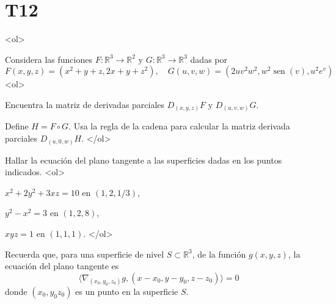 \documentclass{article}
\theoremstyle{definition}
\newcommand{\sen}{\operatorname{sen}}
\begin{document}
  \section*{T12 }
  <ol>
  

    
  \item Considera las funciones $F:\mathbb{R}^3\to \mathbb{R}^2$ y $G:\mathbb{R}^3\to \mathbb{R}^3$ dadas
    por
    $$
    F(x,y,z)=(x^2+y+z, 2x+y+z^2), \quad G(u,v,w)=(2uv^2w^2,w^2\sen(v),u^2e^v)
    $$
    <ol>
    \item Encuentra la matriz de derivadas parciales $D_{(x,y,z)}F$ y $D_{(u,v,w)}G$.
    \item Define $H=F\circ G$. Usa la regla de la cadena para calcular la matriz derivada
      parciales $D_{(u,0,w)}H$.
    </ol>


    
  \item Hallar la ecuación del plano tangente a las superficies
    dadas en los puntos indicados.
    <ol>
    \item $x^2+2y^2+3xz=10$ en $(1,2,1/3)$,
    \item $y^2-x^2=3$ en $(1,2,8)$,
    \item $xyz=1$ en $(1,1,1)$.
    </ol>






  \item Recuerda que, para una superficie de nivel $S \subset \mathbb{R}^3$, de la función $g(x,y,z)$,
    la ecuación del plano tangente es
    $$
    \langle \nabla_{(x_0,y_0,z_0)}g, (x-x_0,y-y_0,z-z_0) \rangle =0
    $$
    donde $(x_0,y_0z_0)$ es un punto en la superficie $S$.
\end{document}
